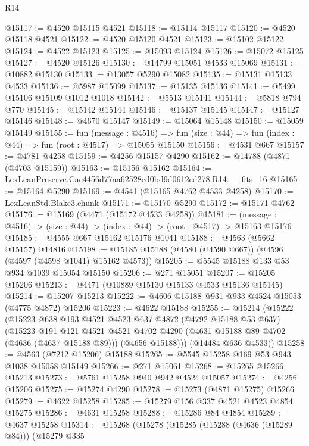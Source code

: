 \begin{lexlean}{R14}
\begin{coremodule}
@15117 := @4520 @15115 @4521
@15118 := @15114 @15117
@15120 := @4520 @15118 @4521
@15122 := @4520 @15120 @4521
@15123 := @15102 @15122
@15124 := @4522 @15123
@15125 := @15093 @15124
@15126 := @15072 @15125
@15127 := @4520 @15126
@15130 := @14799 @15051 @4533 @15069
@15131 := @10882 @15130
@15133 := @13057 @5290 @15082
@15135 := @15131 @15133 @4533
@15136 := @5987 @15099
@15137 := @15135 @15136
@15141 := @5499 @15106 @15109 @1012 @1018
@15142 := @5513 @15141
@15144 := @5818 @794 @770
@15145 := @15142 @15144
@15146 := @15137 @15145
@15147 := @15127 @15146
@15148 := @4670 @15147
@15149 := @15064 @15148
@15150 := @15059 @15149
@15155 := fun (message : @4516) =>
  fun (size : @44) => fun (index : @44) => fun (root : @4517) => @15055 @15150
@15156 := @4531 @667
@15157 := @4781 @4258
@15159 := @4256 @15157 @4290
@15162 := @14788 (@4871 (@4703 @15159))
@15163 := @15156 @15162
@15164 := LexLeanPreserve.Cae4456d77aa62528ed0bd9d0612cd278.R14.__fits_16
@15165 := @15164 @5290
@15169 := @4541 (@15165 @4762 @4533 @4258)
@15170 := LexLeanStd.Blake3.chunk
@15171 := @15170 @5290
@15172 := @15171 @4762
@15176 := @15169 (@4471 (@15172 @4533 @4258))
@15181 := (message : @4516) -> (size : @44) -> (index : @44) -> (root : @4517) -> @15163 @15176
@15185 := @4555 @667 @15162 @15176 @1041
@15188 := @4563 (@5662 @15157) @14816
@15198 := @15185 @15188 (@4580 (@4590 @667)) (@4596 (@4597 (@4598 @1041) @15162 @4573))
@15205 := @5545 @15188 @133 @53 @934 @1039 @15054 @15150
@15206 := @271 @15051
@15207 := @15205 @15206
@15213 := @4471 (@10889 @15130 @15133 @4533 @15136 @15145)
@15214 := @15207 @15213
@15222 := @4606 @15188 @931 @933 @4524 @15053 (@4775 @4872) @15206
@15223 := @4622 @15188
@15255 := @15214
    (@15222
      (@15223
        @638
        @193
        @4521
        @4523
        @637
        @4872
        (@4792 @15188 @53 @637)
        (@15223
          @191
          @121
          @4521
          @4521
          @4702
          @4290
          (@4631 @15188 @89 @4702 (@4636 (@4637 @15188 @89)))
          (@4656 @15188)))
      (@14484 @636 @4533))
@15258 := @4563 (@7212 @15206) @15188
@15265 := @5545 @15258 @169 @53 @943 @1038 @15058 @15149
@15266 := @271 @15061
@15268 := @15265 @15266 @15213
@15273 := @5761 @15258 @940 @942 @4524 @15057
@15274 := @4256 @15206
@15275 := @15274 @4290
@15278 := @15273 (@4871 @15275) @15266
@15279 := @4622 @15258
@15285 := @15279 @156 @337 @4521 @4523 @4854 @15275
@15286 := @4631 @15258
@15288 := @15286 @84 @4854
@15289 := @4637 @15258
@15314 := @15268
    (@15278
      (@15285
        (@15288 (@4636 (@15289 @84)))
        (@15279
          @335

\end{coremodule}
\end{lexlean}
